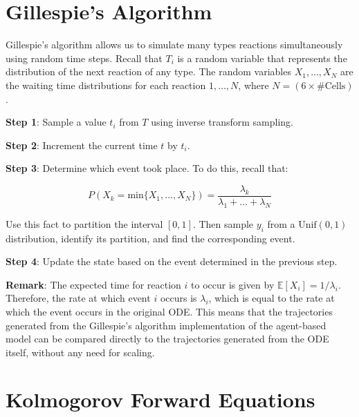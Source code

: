 \documentclass{article}
\begin{document}
\begin{flushleft}

\nocite{*}
\printbibliography

\appendix

\section{Gillespie's Algorithm} \label{sec:gillespie}

Gillespie's algorithm allows us to simulate many types reactions simultaneously using random time steps. Recall that $T_{i}$ is a random variable that represents the distribution of the next reaction of any type. The random variables $X_{1}, \dots, X_{N}$ are the waiting time distributions for each reaction $1, \dots, N$, where $N = (6 \times \text{\# Cells})$.

\medskip

\textbf{Step 1}: Sample a value $t_{i}$ from $T$ using inverse transform sampling. 

\medskip

\textbf{Step 2}: Increment the current time $t$ by $t_{i}$.

\medskip

\textbf{Step 3}: Determine which event took place. To do this, recall that:

$$P(X_{k} = \text{min} \{  X_{1}, \dots, X_{N} \}) = \frac{\lambda_{k}}{\lambda_{1} + \dots + \lambda_{N}}$$

Use this fact to partition the interval $[0, 1]$. Then sample $y_{i}$ from a $\text{Unif}(0, 1)$ distribution, identify its partition, and find the corresponding event.

\medskip

\textbf{Step 4}: Update the state based on the event determined in the previous step.

\medskip

\textbf{Remark}: The expected time for reaction $i$ to occur is given by $\mathbb{E}[X_{i}] = 1/\lambda_{i}$. Therefore, the rate at which event $i$ occurs is $\lambda_{i}$, which is equal to the rate at which the event occurs in the original ODE. This means that the trajectories generated from the Gillespie's algorithm implementation of the agent-based  model can be compared directly to the trajectories generated from the ODE itself, without any need for scaling.

\section{Kolmogorov Forward Equations}
\label{sec:kfe}


\end{flushleft}
\end{document}
